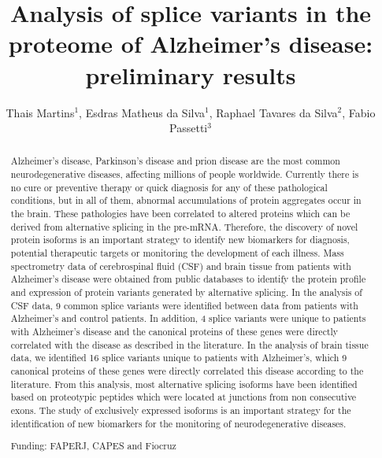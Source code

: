 \documentclass[twoside]{article}
\title{\vspace{-15mm}\fontsize{24pt}{10pt}\selectfont\textbf{Analysis of splice variants in the proteome of Alzheimer's disease: preliminary results}} %
\author{Thais Martins$^1$, Esdras Matheus da Silva$^1$, Raphael Tavares da Silva$^2$, Fabio Passetti$^3$}
\affil{1 OSWALDO CRUZ INSTITUTE\\ 2 UFMG\\ 3 FIOCRUZ - IOC\\ }
\date{}
\begin{document}
\maketitle %

\thispagestyle{fancy} %


\begin{abstract}
Alzheimer's disease, Parkinson's disease and prion disease are the most common neurodegenerative diseases, affecting millions of people worldwide. Currently there is no cure or preventive therapy or quick diagnosis for any of these pathological conditions, but in all of them, abnormal accumulations of protein aggregates occur in the brain. These pathologies have been correlated to altered proteins which can be derived from alternative splicing in the pre-mRNA. Therefore, the discovery of novel protein isoforms is an important strategy to identify new biomarkers for diagnosis, potential therapeutic targets or monitoring the development of each illness. Mass spectrometry data of cerebrospinal fluid (CSF) and brain tissue from patients with Alzheimer's disease were obtained from public databases to identify the protein profile and expression of protein variants generated by alternative splicing. In the analysis of CSF data, 9 common splice variants were identified between data from patients with Alzheimer's and control patients. In addition, 4 splice variants were unique to patients with Alzheimer's disease and the canonical proteins of these genes were directly correlated with the disease as described in the literature. In the analysis of brain tissue data, we identified 16 splice variants unique to patients with Alzheimer's, which 9 canonical proteins of these genes were directly correlated this disease according to the literature. From this analysis, most alternative splicing isoforms have been identified based on proteotypic peptides which were located at junctions from non consecutive exons. The study of exclusively expressed isoforms is an important strategy for the identification of new biomarkers for the monitoring of neurodegenerative diseases.

Funding: FAPERJ, CAPES and Fiocruz
\end{abstract}
\end{document}
